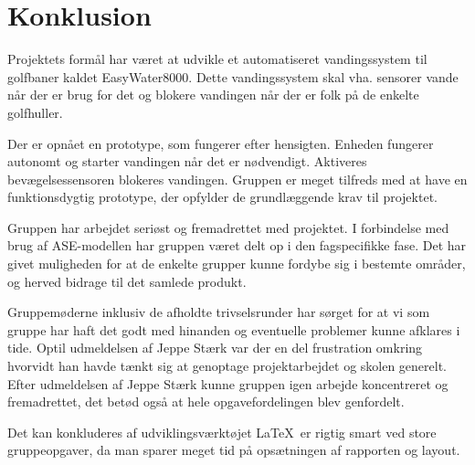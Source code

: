 \chapter{Konklusion}

Projektets formål har været at udvikle et automatiseret vandingssystem til golfbaner kaldet EasyWater8000. Dette vandingssystem skal vha. sensorer vande når der er brug for det og blokere vandingen når der er folk på de enkelte golfhuller. 

Der er opnået en prototype, som fungerer efter hensigten. Enheden fungerer autonomt og starter vandingen når det er nødvendigt. Aktiveres bevægelsessensoren blokeres vandingen. Gruppen er meget tilfreds med at have en funktionsdygtig  prototype, der opfylder de grundlæggende krav til projektet.  

Gruppen har arbejdet seriøst og fremadrettet med projektet. I forbindelse med brug af ASE-modellen har gruppen været delt op i den fagspecifikke fase. Det har givet muligheden for at de enkelte grupper kunne fordybe sig i bestemte områder, og herved bidrage til det samlede produkt.

Gruppemøderne inklusiv de afholdte trivselsrunder har sørget for at vi som gruppe har haft det godt med hinanden og eventuelle problemer kunne afklares i tide. Optil udmeldelsen af Jeppe Stærk var der en del frustration omkring hvorvidt han havde tænkt sig at genoptage projektarbejdet og skolen generelt. Efter udmeldelsen af Jeppe Stærk kunne gruppen igen arbejde koncentreret og fremadrettet, det betød også at hele opgavefordelingen blev genfordelt.  

Det kan konkluderes af udviklingsværktøjet \LaTeX \ er rigtig smart ved store gruppeopgaver, da man sparer meget tid på opsætningen af rapporten og layout.






